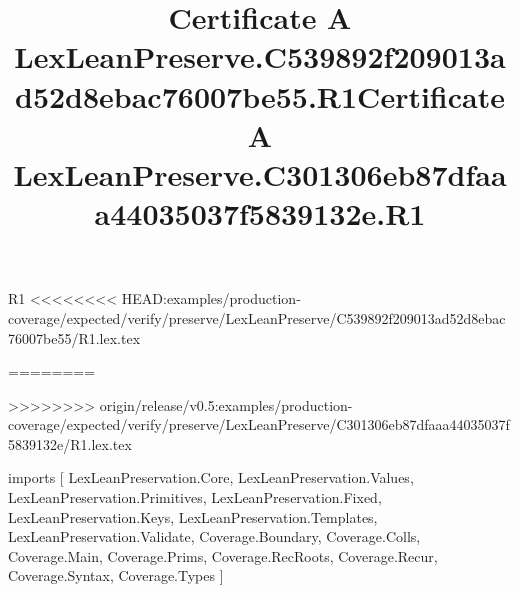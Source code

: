 \begin{lexlean}{R1}
<<<<<<<< HEAD:examples/production-coverage/expected/verify/preserve/LexLeanPreserve/C539892f209013ad52d8ebac76007be55/R1.lex.tex
\title{Certificate A LexLeanPreserve.C539892f209013ad52d8ebac76007be55.R1}
========
\title{Certificate A LexLeanPreserve.C301306eb87dfaaa44035037f5839132e.R1}
>>>>>>>> origin/release/v0.5:examples/production-coverage/expected/verify/preserve/LexLeanPreserve/C301306eb87dfaaa44035037f5839132e/R1.lex.tex
\begin{coremodule}
imports [
  LexLeanPreservation.Core,
  LexLeanPreservation.Values,
  LexLeanPreservation.Primitives,
  LexLeanPreservation.Fixed,
  LexLeanPreservation.Keys,
  LexLeanPreservation.Templates,
  LexLeanPreservation.Validate,
  Coverage.Boundary,
  Coverage.Colls,
  Coverage.Main,
  Coverage.Prims,
  Coverage.RecRoots,
  Coverage.Recur,
  Coverage.Syntax,
  Coverage.Types
]


\end{coremodule}
\end{lexlean}
